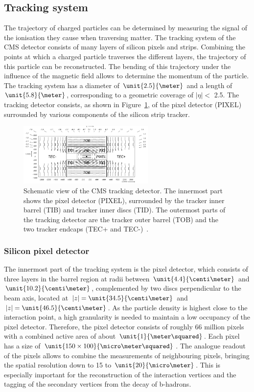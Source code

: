 \subsection{Tracking system}
The trajectory of charged particles can be determined by measuring the signal of the ionisation they cause when traversing matter. The tracking system of the CMS detector consists of many layers of silicon pixels and strips. Combining the points at which a charged particle traverses the different layers, the trajectory of this particle can be reconstructed. The bending of this trajectory under the influence of the magnetic field allows to determine the momentum of the particle. The tracking system has a diameter of $\unit{2.5}{\meter}$ and a length of $\unit{5.8}{\meter}$, corresponding to a geometric coverage of $\vert \eta \vert < $ 2.5. The tracking detector consists, as shown in Figure~\ref{fig:tracker}, of the pixel detector (PIXEL) surrounded by various components of  the silicon strip tracker. 
\begin{figure}[htbp]
\centering
  \includegraphics[width=0.6\textwidth]{plots/CMS/Tracker.png}
\caption{Schematic view of the CMS tracking detector. The innermost part shows the pixel detector (PIXEL), surrounded by the tracker inner barrel (TIB) and tracker inner discs (TID). The outermost parts of the tracking detector are the tracker outer barrel (TOB) and the two tracker endcaps (TEC+ and TEC-)~\cite{CMS}.}
\label{fig:tracker}
\end{figure} 
\subsubsection*{Silicon pixel detector}
The innermost part of the tracking system is the pixel detector, which consists of three layers in the barrel region at radii between $\unit{4.4}{\centi\meter}$ and $\unit{10.2}{\centi\meter}$, complemented by two discs perpendicular to the beam axis, located at $\vert z \vert = \unit{34.5}{\centi\meter}$ and  $\vert z \vert = \unit{46.5}{\centi\meter}$. As the particle density is highest close to the interaction point, a high granularity is needed to maintain a low occupancy of the pixel detector. Therefore, the pixel detector consists of roughly 66 million pixels with a combined active area of about $\unit{1}{\meter\squared}$. Each pixel has a size of $\unit{150\times100}{\micro\meter\squared}$. The analogue readout of the pixels allows to combine the measurements of neighbouring pixels, bringing the spatial resolution down to 15 to $\unit{20}{\micro\meter}$. This is especially important for the reconstruction of the interaction vertices and the tagging of the secondary vertices from the decay of b-hadrons.
